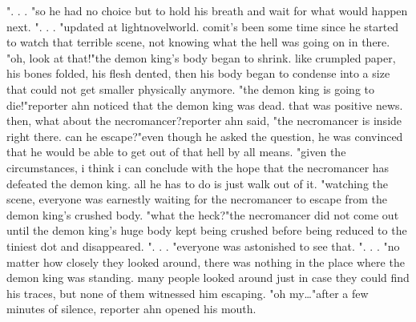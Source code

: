 ".
.
.
"so he had no choice but to hold his breath and wait for what would happen next.
".
.
.
"updated at lightnov­elworld.
c­omit's been some time since he started to watch that terrible scene, not knowing what the hell was going on in there.
"oh, look at that!"the demon king's body began to shrink.
 like crumpled paper, his bones folded, his flesh dented, then his body began to condense into a size that could not get smaller physically anymore.
"the demon king is going to die!"reporter ahn noticed that the demon king was dead.
 that was positive news.
then, what about the necromancer?reporter ahn said, "the necromancer is inside right there.
 can he escape?"even though he asked the question, he was convinced that he would be able to get out of that hell by all means.
"given the circumstances, i think i can conclude with the hope that the necromancer has defeated the demon king.
 all he has to do is just walk out of it.
"watching the scene, everyone was earnestly waiting for the necromancer to escape from the demon king's crushed body.
 "what the heck?"the necromancer did not come out until the demon king's huge body kept being crushed before being reduced to the tiniest dot and disappeared.
".
.
.
"everyone was astonished to see that.
".
.
.
"no matter how closely they looked around, there was nothing in the place where the demon king was standing.
 many people looked around just in case they could find his traces, but none of them witnessed him escaping.
 "oh my…"after a few minutes of silence, reporter ahn opened his mouth.

